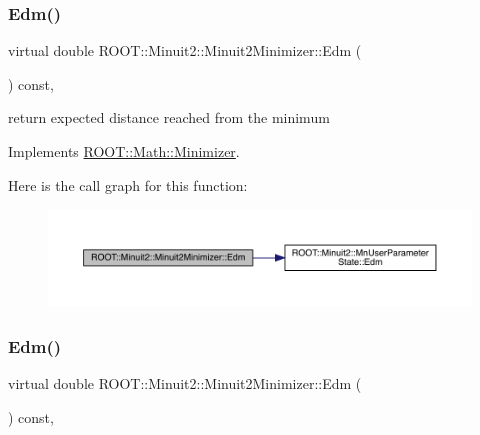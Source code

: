 \subsubsection{\texorpdfstring{Edm()}{Edm()}\hspace{0.1cm}{\footnotesize\ttfamily [2/3]}}
{\footnotesize\ttfamily virtual double R\+O\+O\+T\+::\+Minuit2\+::\+Minuit2\+Minimizer\+::\+Edm (\begin{DoxyParamCaption}{ }\end{DoxyParamCaption}) const\hspace{0.3cm}{\ttfamily [inline]}, {\ttfamily [virtual]}}



return expected distance reached from the minimum 



Implements \mbox{\hyperlink{classROOT_1_1Math_1_1Minimizer_a990c6935849a3fb31aedab1df6c26f28}{R\+O\+O\+T\+::\+Math\+::\+Minimizer}}.

Here is the call graph for this function\+:
\nopagebreak
\begin{figure}[H]
\begin{center}
\leavevmode
\includegraphics[width=350pt]{d0/d9c/classROOT_1_1Minuit2_1_1Minuit2Minimizer_ab9c1bfaaaf4c12acd1fd96ece3509269_cgraph}
\end{center}
\end{figure}
\mbox{\label{classROOT_1_1Minuit2_1_1Minuit2Minimizer_ab9c1bfaaaf4c12acd1fd96ece3509269}} 
\subsubsection{\texorpdfstring{Edm()}{Edm()}\hspace{0.1cm}{\footnotesize\ttfamily [3/3]}}
{\footnotesize\ttfamily virtual double R\+O\+O\+T\+::\+Minuit2\+::\+Minuit2\+Minimizer\+::\+Edm (\begin{DoxyParamCaption}{ }\end{DoxyParamCaption}) const\hspace{0.3cm}{\ttfamily [inline]}, {\ttfamily [virtual]}}




